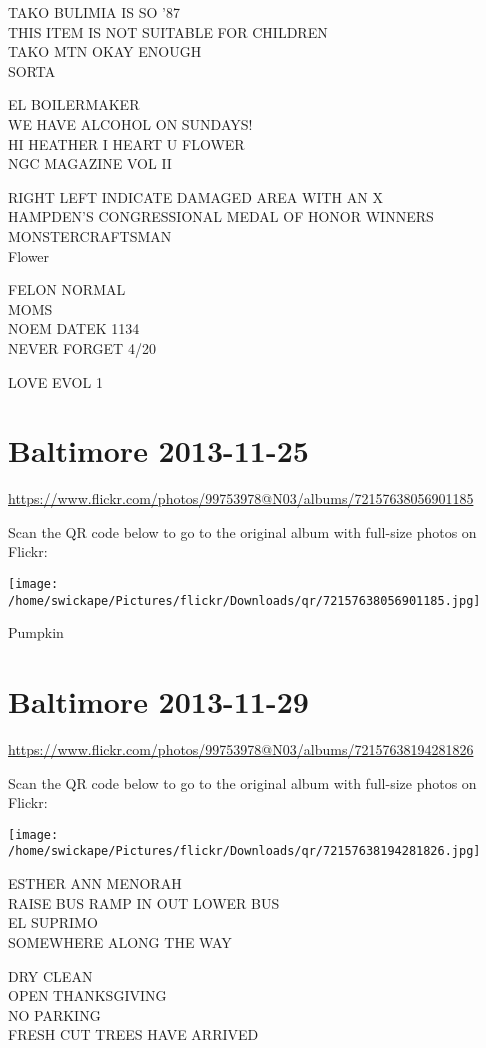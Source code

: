 \documentclass[10pt,letterpaper]{article}
\begin{document}
TAKO BULIMIA IS SO '87\\
THIS ITEM IS NOT SUITABLE FOR CHILDREN\\
TAKO MTN OKAY ENOUGH\\
SORTA

EL BOILERMAKER\\
WE HAVE ALCOHOL ON SUNDAYS!\\
HI HEATHER I HEART U FLOWER\\
NGC MAGAZINE VOL II

RIGHT LEFT INDICATE DAMAGED AREA WITH AN X\\
HAMPDEN'S CONGRESSIONAL MEDAL OF HONOR WINNERS\\
MONSTERCRAFTSMAN\\
Flower

FELON NORMAL\\
MOMS\\
NOEM DATEK 1134\\
NEVER FORGET 4/20

LOVE EVOL 1


\section*{Baltimore 2013-11-25}

\url{https://www.flickr.com/photos/99753978@N03/albums/72157638056901185}

Scan the QR code below to go to the original album with full-size photos on Flickr:

\texttt{[image: /home/swickape/Pictures/flickr/Downloads/qr/72157638056901185.jpg]}


Pumpkin


\section*{Baltimore 2013-11-29}

\url{https://www.flickr.com/photos/99753978@N03/albums/72157638194281826}

Scan the QR code below to go to the original album with full-size photos on Flickr:

\texttt{[image: /home/swickape/Pictures/flickr/Downloads/qr/72157638194281826.jpg]}


ESTHER ANN MENORAH\\
RAISE BUS RAMP IN OUT LOWER BUS\\
EL SUPRIMO\\
SOMEWHERE ALONG THE WAY

DRY CLEAN\\
OPEN THANKSGIVING\\
NO PARKING\\
FRESH CUT TREES HAVE ARRIVED
\end{document}
